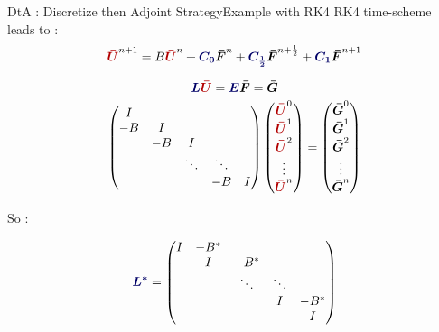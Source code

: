 \begin{frame}{DtA : Discretize then Adjoint Strategy}{Example with RK4}
\small
      RK4 time-scheme leads to :
    \begin{equation}
      \discreteU^{n+1}=B\discreteU^n+\textcolor{\myblue}{{\boldsymbol{C_0}}}\discreteF^n+\textcolor{\myblue}{{\boldsymbol{C_{\frac{1}{2}}}}}\discreteF^{n+\frac{1}{2}}+\textcolor{\myblue}{{\boldsymbol{C_1}}}\discreteF^{n+1}
    \end{equation}

\begin{equation}
  \textcolor{\myblue}{{\boldsymbol{L}}}\discreteU=\textcolor{\myblue}{{\boldsymbol{E}}}\discreteF=\discreteG
\end{equation}
\begin{equation}
  \begin{pmatrix}
    I & & & & \\
    -B&I & & & \\
    & -B&I  & & \\
    & & \ddots & \ddots   & \\
    & &  & -B &I \\
  \end{pmatrix}
  \begin{pmatrix}
    \discreteU^0 \\
    \discreteU^1 \\
    \discreteU^2 \\
    \vdots \\
    \discreteU^n \\
  \end{pmatrix}=
  \begin{pmatrix}
    \discreteG^0 \\
    \discreteG^1 \\
    \discreteG^2 \\
    \vdots \\
    \discreteG^n \\
  \end{pmatrix}
\end{equation}

So :

\begin{equation}
  \textcolor{\myblue}{{\boldsymbol{L^*}}}=\begin{pmatrix}
  I &-B^* & & & \\
  &I &-B^* & & \\
  & &\ddots  &\ddots & \\
  & &  & I   &-B^* \\
  & &  &  &I \\
  \end{pmatrix}
\end{equation}
\end{frame}





